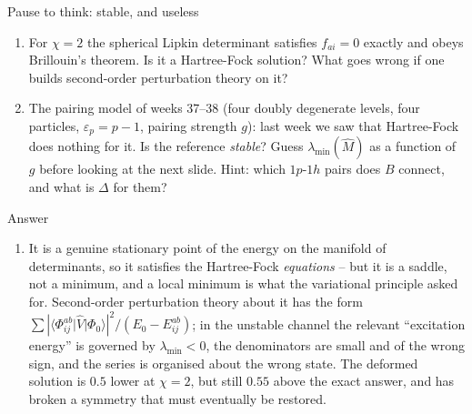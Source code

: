 \documentclass[aspectratio=169,10pt]{beamer}
\newcounter{thinkctr}
\newcommand{\thinkq}[2]{%
  \stepcounter{thinkctr}%
  \begin{tcolorbox}[colback=palewarm,colframe=warm,title={\bfseries Pause to think \#\thethinkctr\hfill\mdseries\small(about #1 min -- discuss with your neighbour)},fonttitle=\bfseries]
  #2
  \end{tcolorbox}}
\newcommand{\thinka}[1]{%
  \begin{tcolorbox}[colback=paleteal,colframe=teal,title={\bfseries Answer to pause \#\thethinkctr}]
  #1
  \end{tcolorbox}}
\newcommand{\element}[3]{\langle #1\vert #2\vert #3\rangle}
\begin{document}
\begin{frame}{Pause to think: stable, and useless}
  \thinkq{4}{
  \begin{enumerate}
    \item For $\chi=2$ the spherical Lipkin determinant satisfies $f_{ai}=0$ exactly and obeys Brillouin's theorem. Is it a Hartree-Fock solution? What goes wrong if one builds second-order perturbation theory on it?
    \item The pairing model of weeks 37--38 (four doubly degenerate levels, four particles, $\varepsilon_p=p-1$, pairing strength $g$): last week we saw that Hartree-Fock does nothing for it. Is the reference \emph{stable}? Guess $\lambda_{\min}(\hat{M})$ as a function of $g$ before looking at the next slide. Hint: which $1p$-$1h$ pairs does $B$ connect, and what is $\Delta$ for them?
  \end{enumerate}}
\end{frame}

\begin{frame}{Answer}
  \thinka{
  \begin{enumerate}
    \item It is a genuine stationary point of the energy on the manifold of determinants, so it satisfies the Hartree-Fock \emph{equations} -- but it is a saddle, not a minimum, and a local minimum is what the variational principle asked for. Second-order perturbation theory about it has the form $\sum|\element{\Phi_{ij}^{ab}}{\hat{V}}{\Phi_0}|^2/(E_0-E_{ij}^{ab})$; in the unstable channel the relevant ``excitation energy'' is governed by $\lambda_{\min}<0$, the denominators are small and of the wrong sign, and the series is organised about the wrong state. The deformed solution is $0.5$ lower at $\chi=2$, but still $0.55$ above the exact answer, and has broken a symmetry that must eventually be restored.
  \end{enumerate}}
\end{frame}
\end{document}
